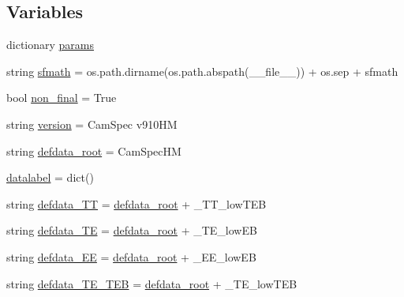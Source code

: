 \subsection*{Variables}
\begin{DoxyCompactItemize}
\item 
dictionary \mbox{\hyperlink{namespaceplanckStyle_a1666da6ae091dd32e1a56e606247632e}{params}}
\item 
string \mbox{\hyperlink{namespaceplanckStyle_aa70f5db3bdb6b5ab09502be486e698dc}{sfmath}} = os.\+path.\+dirname(os.\+path.\+abspath(\+\_\+\+\_\+file\+\_\+\+\_\+)) + os.\+sep + \textquotesingle{}sfmath\textquotesingle{}
\item 
bool \mbox{\hyperlink{namespaceplanckStyle_aac2007e0420296d8eb74a94d111170d8}{non\+\_\+final}} = True
\item 
string \mbox{\hyperlink{namespaceplanckStyle_a5421450fd31f8abd831555a9bd2e0512}{version}} = \textquotesingle{}Cam\+Spec v910\+HM\textquotesingle{}
\item 
string \mbox{\hyperlink{namespaceplanckStyle_a0e660a6b993d079309a2b0f97276e0d3}{defdata\+\_\+root}} = \textquotesingle{}Cam\+Spec\+HM\textquotesingle{}
\item 
\mbox{\hyperlink{namespaceplanckStyle_a8da1128119eb2cdd66bc98e4099d374c}{datalabel}} = dict()
\item 
string \mbox{\hyperlink{namespaceplanckStyle_ae9a486070a1102293ca26bf924f115e2}{defdata\+\_\+\+TT}} = \mbox{\hyperlink{namespaceplanckStyle_a0e660a6b993d079309a2b0f97276e0d3}{defdata\+\_\+root}} + \textquotesingle{}\+\_\+\+T\+T\+\_\+low\+T\+EB\textquotesingle{}
\item 
string \mbox{\hyperlink{namespaceplanckStyle_aeee99de3a01f51f4be59a1433917578a}{defdata\+\_\+\+TE}} = \mbox{\hyperlink{namespaceplanckStyle_a0e660a6b993d079309a2b0f97276e0d3}{defdata\+\_\+root}} + \textquotesingle{}\+\_\+\+T\+E\+\_\+low\+EB\textquotesingle{}
\item 
string \mbox{\hyperlink{namespaceplanckStyle_a44093b40242f48da288cb2c1c94d4150}{defdata\+\_\+\+EE}} = \mbox{\hyperlink{namespaceplanckStyle_a0e660a6b993d079309a2b0f97276e0d3}{defdata\+\_\+root}} + \textquotesingle{}\+\_\+\+E\+E\+\_\+low\+EB\textquotesingle{}
\item 
string \mbox{\hyperlink{namespaceplanckStyle_ae49138503c2c204b804108bf89353030}{defdata\+\_\+\+T\+E\+\_\+\+T\+EB}} = \mbox{\hyperlink{namespaceplanckStyle_a0e660a6b993d079309a2b0f97276e0d3}{defdata\+\_\+root}} + \textquotesingle{}\+\_\+\+T\+E\+\_\+low\+T\+EB\textquotesingle{}
\item 

\end{DoxyCompactItemize}
